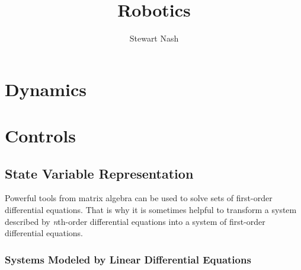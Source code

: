 \documentclass[11pt]{book}
\begin{document}
\title{Robotics}
\author{Stewart Nash}

\maketitle

\tableofcontents

\mainmatter

\chapter{Dynamics}

\chapter{Controls}

\section{State Variable Representation}

Powerful tools from matrix algebra can be used to solve sets of first-order differential equations. That is why it is sometimes helpful to transform a system described by \emph{n}th-order differential equations into a system of first-order differential equations.

\subsection{Systems Modeled by Linear Differential Equations}
\end{document}
